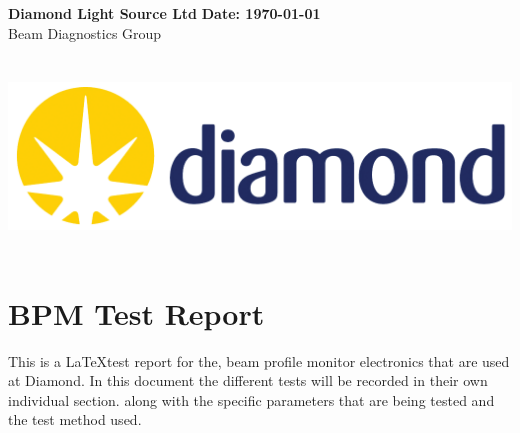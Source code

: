\documentclass[a4paper, 11pt]{article}%
\begin{document}
%
\normalsize%
\noindent%
\large\textbf{Diamond Light Source Ltd} \hfill\large\textbf{Date: \today}%
\\\normalsize Beam Diagnostics Group \hfill\\%
\\\\\includegraphics[width = 1\textwidth]{./Latex_Report/Logo.PNG}\\\\%
\section*{BPM Test Report}%
This is a \LaTeX test report for the, beam profile monitor electronics that are used at Diamond. In this document the different tests will be recorded in their own individual section. along with the specific parameters that are being tested and the test method used.\\\\%
\clearpage%
\tableofcontents%
\listoffigures%
\end{document}
